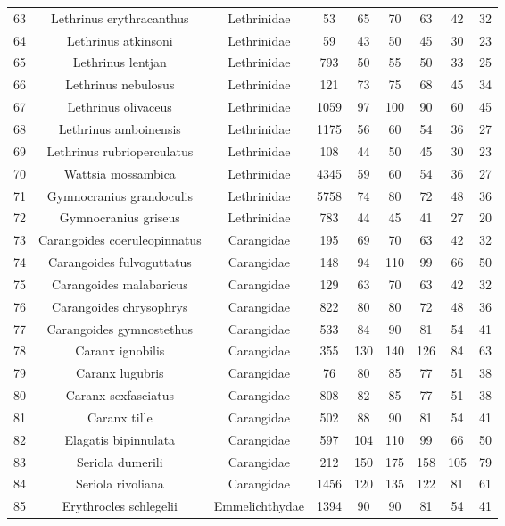 {\begin{longtable}{ccccccccc}
  63 & Lethrinus erythracanthus & Lethrinidae & 53 & 65 & 70 & 63 & 42 & 32 \\ 
  64 & Lethrinus atkinsoni & Lethrinidae & 59 & 43 & 50 & 45 & 30 & 23 \\ 
  65 & Lethrinus lentjan & Lethrinidae & 793 & 50 & 55 & 50 & 33 & 25 \\ 
  66 & Lethrinus nebulosus & Lethrinidae & 121 & 73 & 75 & 68 & 45 & 34 \\ 
  67 & Lethrinus olivaceus & Lethrinidae & 1059 & 97 & 100 & 90 & 60 & 45 \\ 
  68 & Lethrinus amboinensis & Lethrinidae & 1175 & 56 & 60 & 54 & 36 & 27 \\ 
  69 & Lethrinus rubrioperculatus & Lethrinidae & 108 & 44 & 50 & 45 & 30 & 23 \\ 
  70 & Wattsia mossambica & Lethrinidae & 4345 & 59 & 60 & 54 & 36 & 27 \\ 
  71 & Gymnocranius grandoculis & Lethrinidae & 5758 & 74 & 80 & 72 & 48 & 36 \\ 
  72 & Gymnocranius griseus & Lethrinidae & 783 & 44 & 45 & 41 & 27 & 20 \\ 
  73 & Carangoides coeruleopinnatus & Carangidae & 195 & 69 & 70 & 63 & 42 & 32 \\ 
  74 & Carangoides fulvoguttatus & Carangidae & 148 & 94 & 110 & 99 & 66 & 50 \\ 
  75 & Carangoides malabaricus & Carangidae & 129 & 63 & 70 & 63 & 42 & 32 \\ 
  76 & Carangoides chrysophrys & Carangidae & 822 & 80 & 80 & 72 & 48 & 36 \\ 
  77 & Carangoides gymnostethus & Carangidae & 533 & 84 & 90 & 81 & 54 & 41 \\ 
  78 & Caranx ignobilis & Carangidae & 355 & 130 & 140 & 126 & 84 & 63 \\ 
  79 & Caranx lugubris & Carangidae & 76 & 80 & 85 & 77 & 51 & 38 \\ 
  80 & Caranx sexfasciatus & Carangidae & 808 & 82 & 85 & 77 & 51 & 38 \\ 
  81 & Caranx tille & Carangidae & 502 & 88 & 90 & 81 & 54 & 41 \\ 
  82 & Elagatis bipinnulata & Carangidae & 597 & 104 & 110 & 99 & 66 & 50 \\ 
  83 & Seriola dumerili & Carangidae & 212 & 150 & 175 & 158 & 105 & 79 \\ 
  84 & Seriola rivoliana & Carangidae & 1456 & 120 & 135 & 122 & 81 & 61 \\ 
  85 & Erythrocles schlegelii & Emmelichthydae & 1394 & 90 & 90 & 81 & 54 & 41 \\ 

\end{longtable}}
